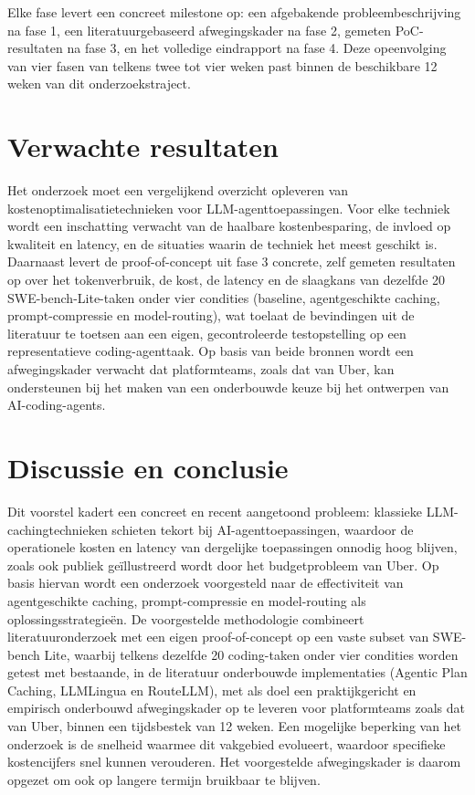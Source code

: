 \documentclass{hogent-article}
\begin{document}
Elke fase levert een concreet milestone op: een afgebakende probleembeschrijving na fase 1, een literatuurgebaseerd afwegingskader na fase 2, gemeten PoC-resultaten na fase 3, en het volledige eindrapport na fase 4. Deze opeenvolging van vier fasen van telkens twee tot vier weken past binnen de beschikbare 12 weken van dit onderzoekstraject.

\section{Verwachte resultaten}%
\label{sec:resultaten}

Het onderzoek moet een vergelijkend overzicht opleveren van kostenoptimalisatietechnieken voor LLM-agenttoepassingen. Voor elke techniek wordt een inschatting verwacht van de haalbare kostenbesparing, de invloed op kwaliteit en latency, en de situaties waarin de techniek het meest geschikt is. Daarnaast levert de proof-of-concept uit fase 3 concrete, zelf gemeten resultaten op over het tokenverbruik, de kost, de latency en de slaagkans van dezelfde 20 SWE-bench-Lite-taken onder vier condities (baseline, agentgeschikte caching, prompt-compressie en model-routing), wat toelaat de bevindingen uit de literatuur \autocite{Zhang2025, Jiang2023, Ong2024} te toetsen aan een eigen, gecontroleerde testopstelling op een representatieve coding-agenttaak. Op basis van beide bronnen wordt een afwegingskader verwacht dat platformteams, zoals dat van Uber, kan ondersteunen bij het maken van een onderbouwde keuze bij het ontwerpen van AI-coding-agents.

\section{Discussie en conclusie}%
\label{sec:conclusie}

Dit voorstel kadert een concreet en recent aangetoond probleem: klassieke LLM-cachingtechnieken schieten tekort bij AI-agenttoepassingen, waardoor de operationele kosten en latency van dergelijke toepassingen onnodig hoog blijven, zoals ook publiek geïllustreerd wordt door het budgetprobleem van Uber. Op basis hiervan wordt een onderzoek voorgesteld naar de effectiviteit van agentgeschikte caching, prompt-compressie en model-routing als oplossingsstrategieën. De voorgestelde methodologie combineert literatuuronderzoek met een eigen proof-of-concept op een vaste subset van SWE-bench Lite, waarbij telkens dezelfde 20 coding-taken onder vier condities worden getest met bestaande, in de literatuur onderbouwde implementaties (Agentic Plan Caching, LLMLingua en RouteLLM), met als doel een praktijkgericht en empirisch onderbouwd afwegingskader op te leveren voor platformteams zoals dat van Uber, binnen een tijdsbestek van 12 weken. Een mogelijke beperking van het onderzoek is de snelheid waarmee dit vakgebied evolueert, waardoor specifieke kostencijfers snel kunnen verouderen. Het voorgestelde afwegingskader is daarom opgezet om ook op langere termijn bruikbaar te blijven.

\printbibliography[heading=bibintoc]
\end{document}

